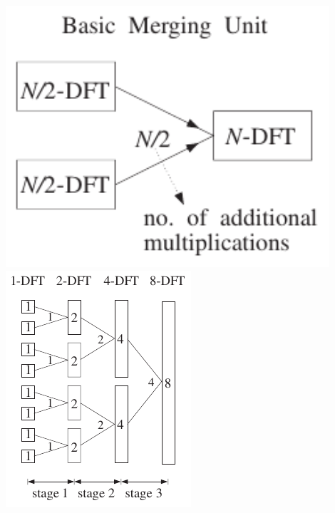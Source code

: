		\begin{minipage}{0.25\textwidth}
			\hspace*{0.25cm}\includegraphics[width = 0.9\textwidth]{pic/multistageDFTeinheit.pdf}\\
			\includegraphics[width = \textwidth]{pic/multistageDFT.pdf}
		\end{minipage}
\newpage
